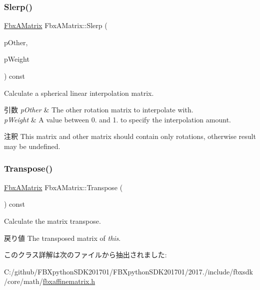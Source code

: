 \mbox{\label{class_fbx_a_matrix_a1dc557020e7cdaa9de99a87a35cc315e}} 
\subsubsection{\texorpdfstring{Slerp()}{Slerp()}}
{\footnotesize\ttfamily \hyperlink{class_fbx_a_matrix}{Fbx\+A\+Matrix} Fbx\+A\+Matrix\+::\+Slerp (\begin{DoxyParamCaption}\item[{const \hyperlink{class_fbx_a_matrix}{Fbx\+A\+Matrix} \&}]{p\+Other,  }\item[{\hyperlink{class_fbx_a_matrix_ad463edbb9fea344643297701f159faa7}{double}}]{p\+Weight }\end{DoxyParamCaption}) const}

Calculate a spherical linear interpolation matrix. 
\begin{DoxyParams}{引数}
{\em p\+Other} & The other rotation matrix to interpolate with. \\
\hline
{\em p\+Weight} & A value between 0. and 1. to specify the interpolation amount. \\
\hline
\end{DoxyParams}
\begin{DoxyRemark}{注釈}
This matrix and other matrix should contain only rotations, otherwise result may be undefined. 
\end{DoxyRemark}
\mbox{\label{class_fbx_a_matrix_a94915f3c5de6c16d4c39a5acc3a84bd7}} 
\subsubsection{\texorpdfstring{Transpose()}{Transpose()}}
{\footnotesize\ttfamily \hyperlink{class_fbx_a_matrix}{Fbx\+A\+Matrix} Fbx\+A\+Matrix\+::\+Transpose (\begin{DoxyParamCaption}{ }\end{DoxyParamCaption}) const}

Calculate the matrix transpose. \begin{DoxyReturn}{戻り値}
The transposed matrix of {\itshape this}. 
\end{DoxyReturn}


このクラス詳解は次のファイルから抽出されました\+:\begin{DoxyCompactItemize}
\item 
C\+:/github/\+F\+B\+Xpython\+S\+D\+K201701/\+F\+B\+Xpython\+S\+D\+K201701/2017./include/fbxsdk/core/math/\hyperlink{fbxaffinematrix_8h}{fbxaffinematrix.\+h}\end{DoxyCompactItemize}
